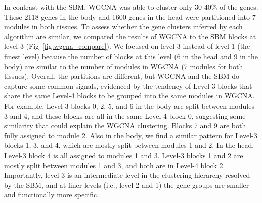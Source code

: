 \documentclass[
]{article}
\begin{document}
In contrast with the SBM, WGCNA was able to cluster only 30-40\% of the
genes. These 2118 genes in the body and 1600 genes in the head were
partitioned into 7 modules in both tissues. To assess whether the gene
clusters inferred by each algorithm are similar, we compared the results
of WGCNA to the SBM blocks at level 3 (Fig~\ref{fig:wgcna_compare}). We
focused on level 3 instead of level 1 (the finest level) because the
number of blocks at this level (6 in the head and 9 in the body) are
similar to the number of modules in WGCNA (7 modules for both tissues).
Overall, the partitions are different, but WGCNA and the SBM do capture
some common signals, evidenced by the tendency of Level-3 blocks that
share the same Level-4 blocks to be grouped into the same modules in
WGCNA. For example, Level-3 blocks 0, 2, 5, and 6 in the body are split
between modules 3 and 4, and these blocks are all in the same Level-4
block 0, suggesting some similarity that could explain the WGCNA
clustering. Blocks 7 and 9 are both fully assigned to module 2. Also in
the body, we find a similar pattern for Level-3 blocks 1, 3, and 4,
which are mostly split between modules 1 and 2. In the head, Level-3
block 4 is all assigned to modules 1 and 3. Level-3 blocks 1 and 2 are
mostly split between modules 1 and 3, and both are in Level-4 block 2.
Importantly, level 3 is an intermediate level in the clustering
hierarchy resolved by the SBM, and at finer levels (i.e., level 2 and 1)
the gene groups are smaller and functionally more specific.
\end{document}
